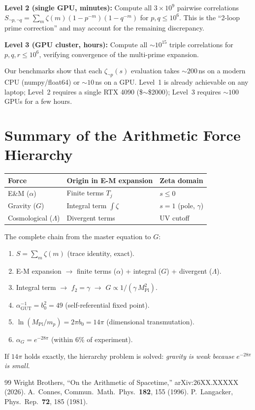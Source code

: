 \documentclass[aps,prl,twocolumn,superscriptaddress,nofootinbib]{revtex4-2}
\begin{document}
\medskip
\noindent\textbf{Level 2 (single GPU, minutes):} Compute all
$3\times 10^9$ pairwise correlations
$S_{\neg p,\neg q}=\sum_m\zeta(m)(1{-}p^{-m})(1{-}q^{-m})$ for
$p,q\leq 10^6$.  This is the ``2-loop prime correction'' and may
account for the remaining discrepancy.

\medskip
\noindent\textbf{Level 3 (GPU cluster, hours):} Compute all
$\sim 10^{15}$ triple correlations for $p,q,r\leq 10^6$, verifying
convergence of the multi-prime expansion.

\medskip
\noindent Our benchmarks show that each $\zeta_{\neg p}(s)$
evaluation takes $\sim 200$\,ns on a modern CPU (numpy/float64) or
$\sim 10$\,ns on a GPU.  Level~1 is already achievable on any
laptop; Level~2 requires a single RTX 4090 (\$$\sim$\$2000);
Level~3 requires $\sim 100$ GPUs for a few hours.

\section{Summary of the Arithmetic Force Hierarchy}

\begin{center}
\begin{tabular}{lll}
\toprule
Force & Origin in E-M expansion & Zeta domain \\
\midrule
E\&M ($\alpha$) & Finite terms $T_j$ & $s\leq 0$ \\
Gravity ($G$) & Integral term $\int\zeta$ & $s=1$ (pole, $\gamma$) \\
Cosmological ($\Lambda$) & Divergent terms & UV cutoff \\
\bottomrule
\end{tabular}
\end{center}

The complete chain from the master equation to $G$:
\begin{enumerate}
\item $S=\sum_m\zeta(m)$ (trace identity, exact).
\item E-M expansion $\to$ finite terms ($\alpha$) + integral ($G$) + divergent ($\Lambda$).
\item Integral term $\to$ $f_2=\gamma$ $\to$ $G\propto 1/(\gamma\,M_{\mathrm{Pl}}^2)$.
\item $\alpha_{\mathrm{GUT}}^{-1}=b_0^2=49$ (self-referential fixed point).
\item $\ln(M_{\mathrm{Pl}}/m_p)=2\pi b_0=14\pi$ (dimensional transmutation).
\item $\alpha_G=e^{-28\pi}$ (within 6\% of experiment).
\end{enumerate}

If $14\pi$ holds exactly, the hierarchy problem is solved:
\emph{gravity is weak because} $e^{-28\pi}$ \emph{is small}.

\begin{thebibliography}{99}
 Wright Brothers, ``On the Arithmetic of Spacetime,'' arXiv:26XX.XXXXX (2026).
 A.~Connes, Commun.\ Math.\ Phys.\ \textbf{182}, 155 (1996).
 P.~Langacker, Phys.\ Rep.\ \textbf{72}, 185 (1981).
\end{thebibliography}
\end{document}
